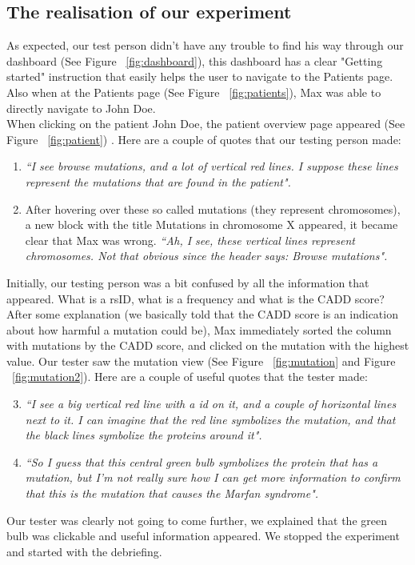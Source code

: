 \subsection{The realisation of our experiment}
As expected, our test person didn't have any trouble to find his way through our dashboard (See Figure ~\ref{fig:dashboard}), this dashboard has a clear "Getting started" instruction that easily helps the user to navigate to the Patients page. Also when at the Patients page (See Figure ~\ref{fig:patients}), Max was able to directly navigate to John Doe. \\
When clicking on the patient John Doe, the patient overview page appeared (See Figure ~\ref{fig:patient}) . Here are a couple of quotes that our testing person made:
\begin{enumerate}
\item \textit{``I see browse mutations, and a lot of vertical red lines. I suppose these lines represent the mutations that are found in the patient".}
\item After hovering over these so called mutations (they represent chromosomes), a new block with the title Mutations in chromosome X appeared, it became clear that Max was wrong. \textit{``Ah, I see, these vertical lines represent chromosomes. Not that obvious since the header says: Browse mutations".}
\end{enumerate}
Initially, our testing person was a bit confused by all the information that appeared. What is a rsID, what is a frequency and what is the CADD score? After some explanation (we basically told that the CADD score is an indication about how harmful a mutation could be), Max immediately sorted the column with mutations by the CADD score, and clicked on the mutation with the highest value. Our tester saw the mutation view (See Figure ~\ref{fig:mutation} and Figure ~\ref{fig:mutation2}). Here are a couple of useful quotes that the tester made: 
\begin{enumerate}
\setcounter{enumi}{2}
\item \textit{``I see a big vertical red line with a id on it, and a couple of horizontal lines next to it. I can imagine that the red line symbolizes the mutation, and that the black lines symbolize the proteins around it". }
\item \textit{``So I guess that this central green bulb symbolizes the protein that has a mutation, but I'm not really sure how I can get more information to confirm that this is the mutation that causes the Marfan syndrome". }
\end{enumerate}
Our tester was clearly not going to come further, we explained that the green bulb was clickable and useful information appeared. We stopped the experiment and started with the debriefing.
